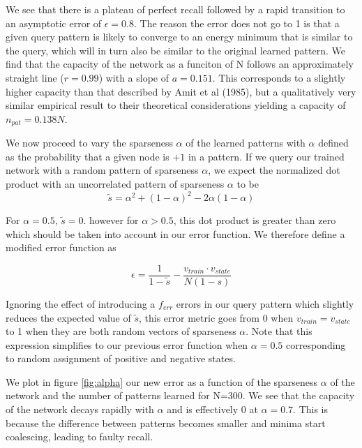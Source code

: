 \documentclass{article}
\begin{document}
We see that there is a plateau of perfect recall followed by a rapid transition to an asymptotic error of $\epsilon = 0.8$. The reason the error does not go to 1 is that a given query pattern is likely to converge to an energy minimum that is similar to the query, which will in turn also be similar to the original learned pattern. We find that the capacity of the network as a funciton of N follows an approximately straight line ($r=0.99$) with a slope of $a=0.151$. This corresponds to a slightly higher capacity than that described by Amit et al (1985), but a qualitatively very similar empirical result to their theoretical considerations yielding a capacity of $n_{pat} = 0.138 N$.

We now proceed to vary the sparseness $\alpha$ of the learned patterns with $\alpha$ defined as the probability that a given node is $+1$ in a pattern.
If we query our trained network with a random pattern of sparseness $\alpha$, we expect the normalized dot product with an uncorrelated pattern of sparseness $\alpha$ to be
\begin{equation}
\tilde s = \alpha^2+(1-\alpha)^2-2\alpha(1-\alpha)
\end{equation}

For $\alpha=0.5$, $\tilde s = 0$. however for $\alpha>0.5$, this dot product is greater than zero which should be taken into account in our error function. We therefore define a modified error function as 

\begin{equation}
\epsilon = \dfrac{1}{1-\tilde s} - \dfrac{v_{train}\cdot v_{state}}{N(1-s)}
\end{equation}

Ignoring the effect of introducing a $f_{err}$ errors in our query pattern which slightly reduces the expected value of $\tilde s$, this error metric goes from 0 when $v_{train} = v_{state}$ to 1 when they are both random vectors of sparseness $\alpha$. Note that this expression simplifies to our previous error function when $\alpha=0.5$ corresponding to random assignment of positive and negative states.

We plot in figure \ref{fig:alpha} our new error as a function of the sparseness $\alpha$ of the network and the number of patterns learned for N=300. We see that the capacity of the network decays rapidly with $\alpha$ and is effectively 0 at $\alpha = 0.7$. This is because the difference between patterns becomes smaller and minima start coalescing, leading to faulty recall.
\end{document}
